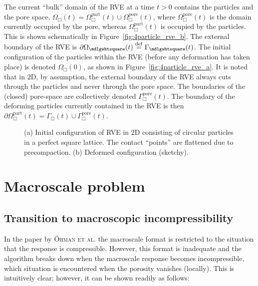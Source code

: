 \documentclass[12pt,a4paper,fleqn]{article}
\renewcommand{\Box}{\mdlgwhtsquare}
\newcommand{\figref}[1]{Figure~\ref{#1}}
\newcommand{\pore}{\mathrm{pore}}
\newcommand{\particle}{\mathrm{part}}
\begin{document}
The current ``bulk'' domain of the RVE at a time $t>0$ contains the particles and the pore space, $\Omega_\Box(t)=\Omega^\particle_\Box(t)\cup\Omega_\Box^\pore(t)$, where $\Omega_\Box^\pore(t)$ is the domain currently occupied by the pore, whereas $\Omega_\Box^\particle(t)$ is occupied by the particles. This is shown schematically in \figref{fig:4particle_rve_b}.
The external boundary of the RVE is $\partial\Omega_\Box(t)\defeq\Gamma_\Box(t)$. The initial configuration of the particles within the RVE (before any deformation has taken place) is denoted $\Omega_\Box(0)$, as shown in \figref{fig:4particle_rve_a}. It is noted that in 2D, by assumption, the external boundary of the RVE always cuts through the particles and never through the pore space. The boundaries of the (closed) pore-space are collectively denoted $\Gamma_\Box^\pore(t)$. The boundary of the deforming particles currently contained in the RVE is then $\partial\Omega^\particle_\Box(t)=\Gamma_\Box(t)\cup\Gamma_\Box^\pore(t)$.
\begin{figure}[th!]
    \centering
    \subfloat[$t = 0$]{\label{fig:4particle_rve_a}}
    \subfloat[$t > 0$]{\label{fig:4particle_rve_b}}
    \caption{(a) Initial configuration of RVE in 2D consisting of circular particles in a perfect square lattice. The contact ``points'' are flattened due to precompaction. (b) Deformed configuration (sketchy).}
    \label{fig:4particleRVE}
\end{figure}

\section{Macroscale problem}\label{sec:macro}

\subsection{Transition to macroscopic incompressibility}

In the paper by \textsc{Öhman et al.} \cite{Ohman2011a} the macroscale format is restricted to the situation that the response is compressible. However, this format is inadequate and the algorithm breaks down when the macroscale response becomes incompressible, which situation is encountered when the porosity vanishes (locally). This is intuitively clear; however, it can be shown readily as follows:
\end{document}
